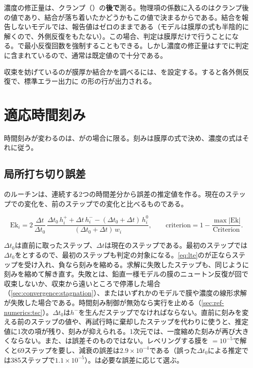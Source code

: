 濃度の修正量は、クランプ（）の\textbf{後で}測る。物理項の係数に入るのはクランプ後の値であり、結合が落ち着いたかどうかもこの値で決まるからである。結合を報告しないモデルでは、報告値はゼロのままである（モデルは膜厚の式も半陰的に解くので、外側反復をもたない）。この場合、判定は膜厚だけで行うことになる。で最小反復回数を強制することもできる。しかし濃度の修正量はすでに判定に含まれているので、通常は既定値ので十分である。

収束を妨げているのが膜厚か結合かを調べるには、を設定する。すると各外側反復で、標準エラー出力に
の形の行が出力される。

\section{適応時間刻み}
\label{sec:time:dt}

時間刻みが変わるのは、がの場合に限る。刻みは膜厚の式で決め、濃度の式はそれに従う。

\subsection{局所打ち切り誤差}

のルーチンは、連続する2つの時間差分から誤差の推定値を作る。現在のステップでの変化を、前のステップでの変化と比べるものである。

\begin{equation}\label{eq:lte}
  \mathrm{Ek}_i = 2\,\frac{\Delta t}{\Delta t_0}\,
    \frac{\Delta t_0\,h^{+}_{i} + \Delta t\,h^{-}_{i}
          - (\Delta t_0+\Delta t)\,h^{0}_{i}}
         {(\Delta t_0+\Delta t)\,w_i},
  \qquad
  \mathrm{criterion} = 1 - \frac{\max\lvert\mathrm{Ek}\rvert}
                                {\mathrm{Criterion}}.
\end{equation}

$\Delta t_0$は直前に取ったステップ、$\Delta t$は現在のステップである。最初のステップでは$\Delta t_0$をとするので、最初のステップも判定の対象になる。\cref{eq:lte}のが正ならステップを受け入れ、負なら刻みを縮める。求解に失敗したステップも、同じように刻みを縮めて解き直す。失敗とは、鉛直一様モデルの膜のニュートン反復が回で収束しないか、収束から遠いところで停滞した場合（\cref{sec:convergence:stagnation}）、またはいずれかのモデルで膜や濃度の線形求解が失敗した場合である。時間刻み制御が無効なら実行を止める（\cref{sec:ref-numerics:tsc}）。$\Delta t_0$は$h^{-}$を生んだステップでなければならない。直前に刻みを変える前のステップの値や、再試行時に棄却したステップを代わりに使うと、推定値に1次の項が残り、刻みが抑えられる。1次元では、一度縮めた刻みが再び大きくならない。また、は誤差そのものではない。レベリングする膜を
$= 10^{-5}$で解くと69ステップを要し、減衰の誤差は$2.9\times10^{-4}$である（誤った$\Delta t_0$による推定では385ステップで$1.1\times10^{-5}$）。は必要な誤差に応じて選ぶ。

